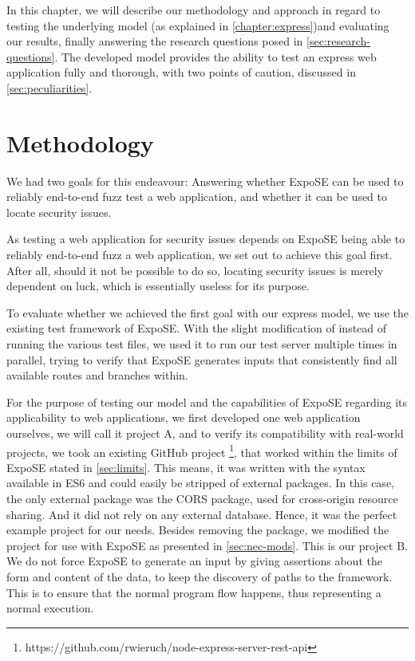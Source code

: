 In this chapter, we will describe our methodology and approach in regard to testing the underlying model (as explained in \autoref{chapter:express})and evaluating our results, finally answering the research questions posed in \autoref{sec:research-questions}. 
The developed model provides the ability to test an express web application fully and thorough, with two points of caution, discussed in \autoref{sec:peculiarities}.

\section{Methodology} 
We had two goals for this endeavour: Answering whether ExpoSE can be used to reliably end-to-end fuzz test a web application, and whether it can be used to locate security issues.

As testing a web application for security issues depends on ExpoSE being able to reliably end-to-end fuzz a web application, we set out to achieve this goal first. After all, should it not be possible to do so, locating security issues is merely dependent on luck, which is essentially useless for its purpose. 

To evaluate whether we achieved the first goal with our express model, we use the existing test framework of ExpoSE. With the slight modification of instead of running the various test files, we used it to run our test server multiple times in parallel, trying to verify that ExpoSE generates inputs that consistently find all available routes and branches within.


For the purpose of testing our model and the capabilities of ExpoSE regarding its applicability to web applications, we first developed one web application ourselves, we will call it project A, and to verify its compatibility with real-world projects, we took an existing GitHub project \footnote{https://github.com/rwieruch/node-express-server-rest-api}, that worked within the limits of ExpoSE stated in \autoref{sec:limits}. This means, it was written with the syntax available in ES6 and could easily be stripped of external packages. In this case, the only external package was the CORS package, used for cross-origin resource sharing. And it did not rely on any external database. Hence, it was the perfect example project for our needs. Besides removing the package, we modified the project for use with ExpoSE as presented in \autoref{sec:nec-mods}. This is our project B.
We do not force ExpoSE to generate an input by giving assertions about the form and content of the data, to keep the discovery of paths to the framework. This is to ensure that the normal program flow happens, thus representing a normal execution. 

